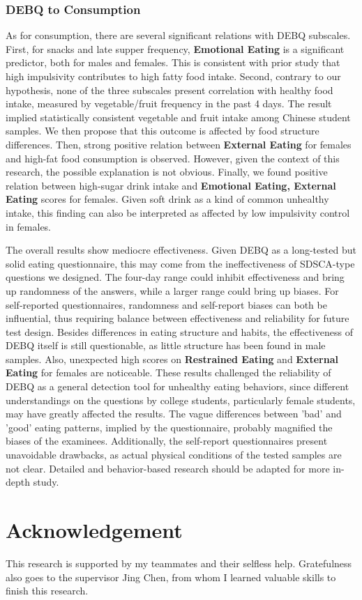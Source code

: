 \documentclass[letterpaper]{article}
\begin{document}
\subsubsection{DEBQ to Consumption}
As for consumption, there are several significant relations with DEBQ subscales. First, for snacks and late supper frequency,
\textbf{Emotional Eating} is a significant predictor, both for males and females. This is consistent with prior study that high
impulsivity contributes to high fatty food intake\cite{limbers2015executive}. Second, contrary to our hypothesis, none of the three
subscales present correlation with healthy food intake, measured by vegetable/fruit frequency in the past 4 days. The result implied statistically consistent vegetable and fruit
intake among Chinese student samples. We then propose that this outcome is affected by food structure differences. Then, strong positive relation between 
\textbf{External Eating} for females and high-fat food consumption is observed. However, given the context of this research, 
the possible explanation is not obvious. Finally, we found positive relation between high-sugar drink intake and \textbf{Emotional Eating, External Eating}
scores for females. Given soft drink as a kind of common unhealthy intake, this finding can also be interpreted as affected by low impulsivity control in females. \\
\smallskip

The overall results show mediocre effectiveness. Given DEBQ as a long-tested but solid eating questionnaire, this may come from the ineffectiveness
of SDSCA-type questions we designed. The four-day range could inhibit effectiveness and bring up randomness of the answers, while a larger range could bring up biases.
For self-reported questionnaires, randomness and self-report biases can both be influential, thus requiring balance between effectiveness and reliability for future test design.
Besides differences in eating structure and habits, the effectiveness of DEBQ itself is still questionable, as little structure has been found in male samples.
Also, unexpected high scores on \textbf{Restrained Eating} and \textbf{External Eating} for females are noticeable. These results challenged the reliability of DEBQ
as a general detection tool for unhealthy eating behaviors, since different understandings on the questions by college students, particularly female students, may have greatly affected the results. 
The vague differences between 'bad' and 'good' eating patterns, implied by the questionnaire, probably magnified the biases of the examinees.
Additionally, the self-report questionnaires present unavoidable drawbacks, as actual physical conditions of the tested samples are not clear. Detailed and behavior-based
research should be adapted for more in-depth study.


\section{Acknowledgement}
This research is supported by my teammates and their selfless help. Gratefulness also goes to the supervisor Jing Chen, from whom
I learned valuable skills to finish this research. 
\end{document}
